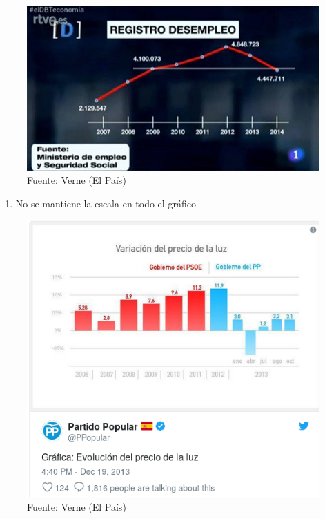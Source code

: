 \documentclass[]{book}
\providecommand{\tightlist}{%
  \setlength{\itemsep}{0pt}\setlength{\parskip}{0pt}}
\theoremstyle{definition}
\theoremstyle{definition}
\theoremstyle{definition}
\theoremstyle{remark}
\begin{document}
\begin{figure}
\centering
\includegraphics{images/grafico_erroneo3.jpg}
\caption{Fuente: Verne (El País)}
\end{figure}

\begin{enumerate}
\def\labelenumi{\arabic{enumi}.}
\setcounter{enumi}{1}
\tightlist
\item
  No se mantiene la escala en todo el gráfico
\end{enumerate}

\begin{figure}
\centering
\includegraphics{images/grafico_erroneo4.png}
\caption{Fuente: Verne (El País)}
\end{figure}
\end{document}
